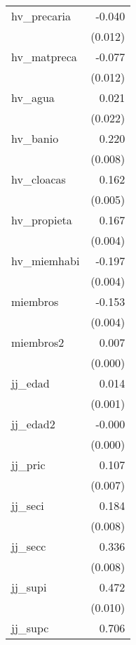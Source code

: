 {\begin{longtable}{l*{1}{D{.}{.}{-1}}}
\addlinespace
hv\_precaria &      -0.040\sym{***}\\
            &     (0.012)         \\
\addlinespace
hv\_matpreca &      -0.077\sym{***}\\
            &     (0.012)         \\
\addlinespace
hv\_agua     &       0.021         \\
            &     (0.022)         \\
\addlinespace
hv\_banio    &       0.220\sym{***}\\
            &     (0.008)         \\
\addlinespace
hv\_cloacas  &       0.162\sym{***}\\
            &     (0.005)         \\
\addlinespace
hv\_propieta &       0.167\sym{***}\\
            &     (0.004)         \\
\addlinespace
hv\_miemhabi &      -0.197\sym{***}\\
            &     (0.004)         \\
\addlinespace
miembros    &      -0.153\sym{***}\\
            &     (0.004)         \\
\addlinespace
miembros2   &       0.007\sym{***}\\
            &     (0.000)         \\
\addlinespace
jj\_edad     &       0.014\sym{***}\\
            &     (0.001)         \\
\addlinespace
jj\_edad2    &      -0.000\sym{***}\\
            &     (0.000)         \\
\addlinespace
jj\_pric     &       0.107\sym{***}\\
            &     (0.007)         \\
\addlinespace
jj\_seci     &       0.184\sym{***}\\
            &     (0.008)         \\
\addlinespace
jj\_secc     &       0.336\sym{***}\\
            &     (0.008)         \\
\addlinespace
jj\_supi     &       0.472\sym{***}\\
            &     (0.010)         \\
\addlinespace
jj\_supc     &       0.706\sym{***}\\

\end{longtable}}
